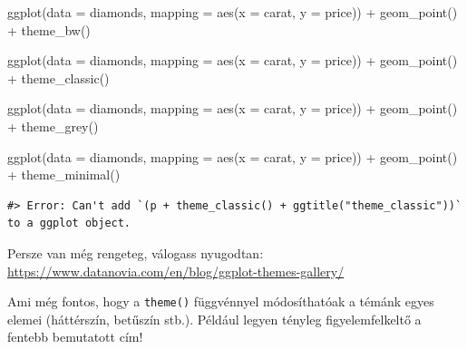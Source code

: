 \documentclass[
]{article}
\newenvironment{Shaded}{\begin{snugshade}}{\end{snugshade}}
\newcommand{\AttributeTok}[1]{\textcolor[rgb]{0.77,0.63,0.00}{#1}}
\newcommand{\FunctionTok}[1]{\textcolor[rgb]{0.00,0.00,0.00}{#1}}
\newcommand{\NormalTok}[1]{#1}
\newcommand{\SpecialCharTok}[1]{\textcolor[rgb]{0.00,0.00,0.00}{#1}}
\begin{document}
\begin{Shaded}
\begin{Highlighting}[]
\FunctionTok{ggplot}\NormalTok{(}\AttributeTok{data =}\NormalTok{ diamonds, }\AttributeTok{mapping =} \FunctionTok{aes}\NormalTok{(}\AttributeTok{x =}\NormalTok{ carat, }\AttributeTok{y =}\NormalTok{ price)) }\SpecialCharTok{+}
  \FunctionTok{geom\_point}\NormalTok{() }\SpecialCharTok{+}
  \FunctionTok{theme\_bw}\NormalTok{()}

\FunctionTok{ggplot}\NormalTok{(}\AttributeTok{data =}\NormalTok{ diamonds, }\AttributeTok{mapping =} \FunctionTok{aes}\NormalTok{(}\AttributeTok{x =}\NormalTok{ carat, }\AttributeTok{y =}\NormalTok{ price)) }\SpecialCharTok{+}
  \FunctionTok{geom\_point}\NormalTok{() }\SpecialCharTok{+}
  \FunctionTok{theme\_classic}\NormalTok{()}

\FunctionTok{ggplot}\NormalTok{(}\AttributeTok{data =}\NormalTok{ diamonds, }\AttributeTok{mapping =} \FunctionTok{aes}\NormalTok{(}\AttributeTok{x =}\NormalTok{ carat, }\AttributeTok{y =}\NormalTok{ price)) }\SpecialCharTok{+}
  \FunctionTok{geom\_point}\NormalTok{() }\SpecialCharTok{+}
  \FunctionTok{theme\_grey}\NormalTok{()}

\FunctionTok{ggplot}\NormalTok{(}\AttributeTok{data =}\NormalTok{ diamonds, }\AttributeTok{mapping =} \FunctionTok{aes}\NormalTok{(}\AttributeTok{x =}\NormalTok{ carat, }\AttributeTok{y =}\NormalTok{ price)) }\SpecialCharTok{+}
  \FunctionTok{geom\_point}\NormalTok{() }\SpecialCharTok{+}
  \FunctionTok{theme\_minimal}\NormalTok{()}
\end{Highlighting}
\end{Shaded}

\begin{verbatim}
#> Error: Can't add `(p + theme_classic() + ggtitle("theme_classic"))` to a ggplot object.
\end{verbatim}

Persze van még rengeteg, válogass nyugodtan: \url{https://www.datanovia.com/en/blog/ggplot-themes-gallery/}

Ami még fontos, hogy a \texttt{theme()} függvénnyel módosíthatóak a témánk egyes elemei (háttérszín, betűszín stb.). Például legyen tényleg figyelemfelkeltő a fentebb bemutatott cím!
\end{document}
